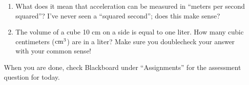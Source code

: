 \documentclass[12pt]{article}
\begin{document}
\begin{enumerate}
	\vspace{2in}
	
	\item What does it mean that acceleration can be measured in ``meters per second squared''? I've never seen a ``squared second'';
	does this make sense?
	
	\vspace{1in}
	
	\item The volume of a cube 10 cm on a side is equal to one liter. How many cubic centimeters (${\rm cm}^3$) are in a liter?
	Make sure you doublecheck your answer with your common sense!
	
	
	\end{enumerate}
	\vfill
	
{\bf \begin{center}
	When you are done, check Blackboard under ``Assignments'' for the assessment question for today.
	\end{center}}

	
	
\end{document}
